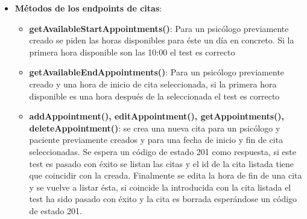 \begin{itemize}
\begin{itemize}
    \end{itemize}
    \item \textbf{Métodos de los endpoints de citas}:
    \begin{itemize}
        \item \textbf{getAvailableStartAppointments()}: Para un psicólogo previamente creado se piden las horas disponibles para éste un día en concreto. Si la primera hora disponible son las 10:00 el test es correcto
        \item \textbf{getAvailableEndAppointments()}: Para un psicólogo previamente creado y una hora de inicio de cita seleccionada, si la primera hora disponible es una hora después de la seleccionada el test es correcto
        \item \textbf{addAppointment(), editAppointment(), getAppointments(), deleteAppointment()}: se crea una nueva cita para un psicólogo y paciente previamente creados y para una fecha de inicio y fin de cita seleccionadas. Se espera un código de estado 201 como respuesta, si este test es pasado con éxito se listan las citas y el id de la cita listada tiene que coincidir con la creada. Finalmente se edita la hora de fin de una cita y se vuelve a listar ésta, si coincide la introducida con la cita listada el test ha sido pasado con éxito y la cita es borrada esperándose un código de estado 201.
    \end{itemize}
    
\end{itemize}




